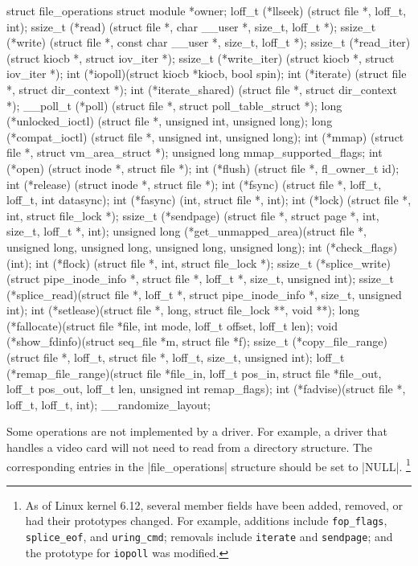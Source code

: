 \documentclass[10pt, oneside]{book}
\begin{document}
\begin{code}
struct file_operations {
    struct module *owner;
    loff_t (*llseek) (struct file *, loff_t, int);
    ssize_t (*read) (struct file *, char __user *, size_t, loff_t *);
    ssize_t (*write) (struct file *, const char __user *, size_t, loff_t *);
    ssize_t (*read_iter) (struct kiocb *, struct iov_iter *);
    ssize_t (*write_iter) (struct kiocb *, struct iov_iter *);
    int (*iopoll)(struct kiocb *kiocb, bool spin);
    int (*iterate) (struct file *, struct dir_context *);
    int (*iterate_shared) (struct file *, struct dir_context *);
    __poll_t (*poll) (struct file *, struct poll_table_struct *);
    long (*unlocked_ioctl) (struct file *, unsigned int, unsigned long);
    long (*compat_ioctl) (struct file *, unsigned int, unsigned long);
    int (*mmap) (struct file *, struct vm_area_struct *);
    unsigned long mmap_supported_flags;
    int (*open) (struct inode *, struct file *);
    int (*flush) (struct file *, fl_owner_t id);
    int (*release) (struct inode *, struct file *);
    int (*fsync) (struct file *, loff_t, loff_t, int datasync);
    int (*fasync) (int, struct file *, int);
    int (*lock) (struct file *, int, struct file_lock *);
    ssize_t (*sendpage) (struct file *, struct page *, int, size_t, loff_t *, int);
    unsigned long (*get_unmapped_area)(struct file *, unsigned long, unsigned long, unsigned long, unsigned long);
    int (*check_flags)(int);
    int (*flock) (struct file *, int, struct file_lock *);
    ssize_t (*splice_write)(struct pipe_inode_info *, struct file *, loff_t *, size_t, unsigned int);
    ssize_t (*splice_read)(struct file *, loff_t *, struct pipe_inode_info *, size_t, unsigned int);
    int (*setlease)(struct file *, long, struct file_lock **, void **);
    long (*fallocate)(struct file *file, int mode, loff_t offset,
        loff_t len);
    void (*show_fdinfo)(struct seq_file *m, struct file *f);
    ssize_t (*copy_file_range)(struct file *, loff_t, struct file *,
        loff_t, size_t, unsigned int);
    loff_t (*remap_file_range)(struct file *file_in, loff_t pos_in,
             struct file *file_out, loff_t pos_out,
             loff_t len, unsigned int remap_flags);
    int (*fadvise)(struct file *, loff_t, loff_t, int);
} __randomize_layout;
\end{code}

Some operations are not implemented by a driver.
For example, a driver that handles a video card will not need to read from a directory structure.
The corresponding entries in the \cpp|file_operations| structure should be set to \cpp|NULL|.
\footnote{
As of Linux kernel 6.12, several member fields have been added, removed, or had their prototypes changed.
For example, additions include \texttt{fop\_flags}, \texttt{splice\_eof}, and \texttt{uring\_cmd};
removals include \texttt{iterate} and \texttt{sendpage}; and the prototype for \texttt{iopoll} was modified.
}
\end{document}
